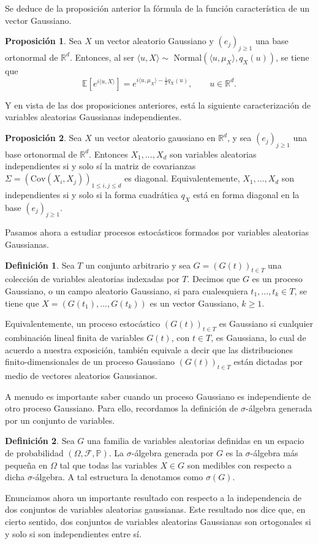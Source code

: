 \documentclass[letterpaper,twoside,12pt]{book}
\newcommand{\R}{\mathbb{R}}
\newcommand{\F}{\mathcal{F}}
\newcommand{\E}{\mathbb{E}}
\renewcommand{\P}{\mathbb{P}}
\newcommand{\1}{\mathds{1}}
\theoremstyle{definition}
\newtheorem{dfn}{Definición}
\theoremstyle{definition}
\theoremstyle{remark}
\theoremstyle{definition}
\theoremstyle{definition}
\newtheorem{prop}{Proposición}
\theoremstyle{definition}
\theoremstyle{definition}
\theoremstyle{definition}
\begin{document}
Se deduce de la proposición anterior la fórmula de la función característica de un vector Gaussiano.
\begin{prop} 
 Sea $X$ un vector aleatorio Gaussiano y $(e_j)_{j\geq1}$ una base ortonormal de $\R^{d}$. Entonces, al ser $\langle u,X\rangle\sim$ Normal$(\langle u,\mu_X\rangle,q_X(u))$, se tiene que %
 \[
 \E\left[e^{i\langle u,X\rangle}\right]=e^{i \langle u,\mu_X\rangle-\frac{1}{2}q_X(u)}, \qquad u\in \R^d.
 \]
 \end{prop}
Y en vista de las dos proposiciones anteriores, está la siguiente caracterización de variables aleatorias Gaussianas independientes.
\begin{prop} 
 Sea $X$ un vector aleatorio gaussiano en $\R^{d}$, y sea $(e_j)_{j\geq1}$ una base ortonormal de $\R^{d}$. Entonces $X_1,...,X_d$ son variables aleatorias independientes si y solo sí la matriz de covarianzas $\Sigma=(\text{Cov}\left(X_i,X_j\right))_{1\leq i,j\leq d}$ es diagonal. Equivalentemente, $X_1,...,X_d$ son independientes si y solo si la forma cuadrática $q_X$ está en forma diagonal en la base $(e_j)_{j\geq1}$.
 \end{prop}

 Pasamos ahora a estudiar procesos estocásticos formados por variables aleatorias Gaussianas.
\begin{dfn} 
 Sea $T$ un conjunto arbitrario y sea $G=(G(t))_{t\in T}$ una colección de variables aleatorias indexadas por $T$. Decimos que $G$ es un proceso Gaussiano, o un campo aleatorio Gaussiano, si para cualesquiera $t_1,...,t_k\in T$, se tiene que $X=(G(t_1),...,G(t_k))$ es un vector Gaussiano, $k\geq1$. 
\end{dfn}

Equivalentemente, un proceso estocástico $(G(t))_{t\in T}$ es Gaussiano si cualquier combinación lineal finita de variables $G(t)$, con $t\in T$, es Gaussiana, lo cual de acuerdo a nuestra exposición, también equivale a decir que las distribuciones finito-dimensionales de un proceso Gaussiano $(G(t))_{t\in T}$ están dictadas por medio de vectores aleatorios Gaussianos.

A menudo es importante saber cuando un proceso Gaussiano es independiente de otro proceso Gaussiano. Para ello, recordamos la definición de $\sigma$-álgebra generada por un conjunto de variables.

\begin{dfn} 
 Sea $G$ una familia de variables aleatorias definidas en un espacio de probabilidad $(\Omega, \F, \P)$. La $\sigma$-álgebra generada por $G$ es la $\sigma$-álgebra más pequeña en $\Omega$ tal que todas las variables $X\in G$ son medibles con respecto a dicha $\sigma$-álgebra. A tal estructura la denotamos como $\sigma(G)$.  
 \end{dfn}
Enunciamos ahora un importante resultado con respecto a la independencia de dos conjuntos de variables aleatorias gaussianas. Este resultado nos dice que, en cierto sentido, dos conjuntos de variables aleatorias Gaussianas son ortogonales si y solo si son independientes entre sí. 
\end{document}
